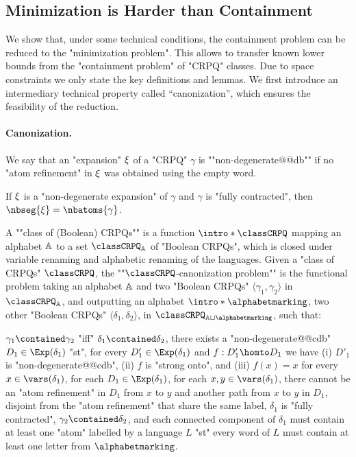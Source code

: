 \subsection{Minimization is Harder than Containment}
We show that, under some technical conditions, the containment problem can be reduced to the "minimization problem". This allows to transfer known lower bounds from the "containment problem" of "CRPQ" classes. Due to space constraints we only state the key definitions and lemmas.
We first introduce an intermediary technical property called ``canonization'',
which ensures the feasibility of the reduction.

\paragraph*{Canonization.}
We say that an "expansion" $\xi$ of a "CRPQ" $\gamma$ is \AP""non-degenerate@@db""
if no "atom refinement" in $\xi$ was obtained using the empty word.

\begin{fact}
	\AP\label{fact:nb-seg-expansion}
	If $\xi$ is a "non-degenerate expansion" of $\gamma$ and
	$\gamma$ is "fully contracted", then $\nbseg{\anexpansion} = \nbatoms{\gamma}$.
\end{fact}

A \AP""class of (Boolean) CRPQs"" is a function \AP$\intro*\classCRPQ$ mapping an alphabet $\mathbb{A}$ 
to a set $\classCRPQ_{\A}$ of "Boolean CRPQs", which is closed under variable renaming and alphabetic
renaming of the languages.
Given a "class of CRPQs" $\classCRPQ$, the \AP""$\classCRPQ$-canonization problem""
is the functional problem taking an alphabet $\mathbb{A}$
and two "Boolean CRPQs" $\langle \gamma_1,\gamma_2\rangle$ in $\classCRPQ_{\A}$,
and outputting an alphabet \AP$\intro*\alphabetmarking$, two other "Boolean CRPQs" $\langle \delta_1, \delta_2 \rangle$, in $\classCRPQ_{\A\sqcup \alphabetmarking}$,
such that:
\begin{description}
	\itemAP[\intro*\axiomCanonMonotonicity{}:] \axiomsCanon
		$\gamma_1 \contained \gamma_2$ "iff" $\delta_1 \contained \delta_2$,
	\itemAP[\intro*\axiomCanonCore{}:]
		there exists a "non-degenerate@@cdb" 
		$D_1 \in \Exp(\delta_1)$ "st", for every $D'_1 \in \Exp(\delta_1)$ and $f: D'_1 \homto D_1$ we have (i) $D'_1$ is "non-degenerate@@cdb", (ii) $f$ is "strong onto", and (iii)  $f(x)=x$ for every $x\in \vars(\delta_1)$,
	\itemAP[\intro*\axiomCanonNonRed{}:] for each $D_1 \in \Exp(\delta_1)$,
		for each $x,y \in \vars(\delta_1)$, there cannot be an "atom refinement" in $D_1$
		from $x$ to $y$ and another path from $x$ to $y$ in $D_1$, disjoint from the "atom refinement" that share the same label,
	\itemAP[\intro*\axiomCanonContracted{}:] $\delta_1$ is "fully contracted",
	\itemAP[\intro*\axiomCanonContainment{}:] $\gamma_2 \contained \delta_2$, and 
	\itemAP[\intro*\axiomCanonMarking{}:] each connected component of $\delta_1$ must contain at least one "atom"
	labelled by a language $L$ "st" every word of $L$ must contain at least one letter from $\alphabetmarking$.
\end{description}

